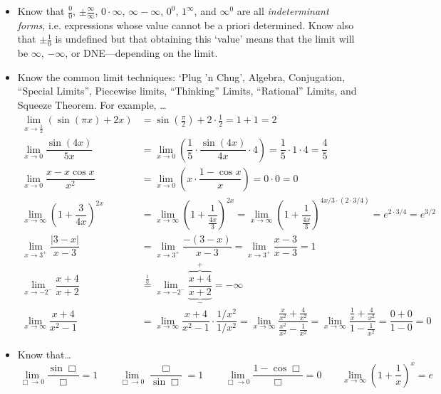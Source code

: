 \documentclass[11pt,letterpaper]{article}
\begin{document}
\begin{itemize}
\item Know that $\tfrac{0}{0}$, $\pm \tfrac{\infty}{\infty}$, $0 \cdot \infty$, $\infty - \infty$, $0^0$, $1^\infty$, and $\infty^0$ are all \textit{indeterminant forms}, i.e. expressions whose value cannot be a priori determined. Know also that $\pm\tfrac{1}{0}$ is undefined but that obtaining this `value' means that the limit will be $\infty$, $-\infty$, or DNE---depending on the limit. 

\item Know the common limit techniques: `Plug 'n Chug', Algebra, Conjugation, ``Special Limits'', Piecewise limits, ``Thinking'' Limits, ``Rational'' Limits, and Squeeze Theorem. For example, \dots
	\[
	\begin{aligned}
	\lim_{x \to \tfrac{1}{2}} \left( \sin(\pi x) + 2x \right)&= \sin \left( \tfrac{\pi}{2} \right) + 2 \cdot \tfrac{1}{2}= 1 + 1= 2 \\[0.3cm]
	\lim_{x \to 0} \dfrac{\sin(4x)}{5x}&= \lim_{x \to 0} \left( \dfrac{1}{5} \cdot \dfrac{\sin(4x)}{4x} \cdot 4 \right)= \dfrac{1}{5} \cdot 1 \cdot 4= \dfrac{4}{5} \\[0.3cm]
	\lim_{x \to 0} \dfrac{x - x \cos x}{x^2}&= \lim_{x \to 0} \left( x \cdot \dfrac{1 - \cos x}{x} \right)= 0 \cdot 0= 0 \\[0.3cm]
	\lim_{x \to \infty} \left(1 + \dfrac{3}{4x} \right)^{2x}&= \lim_{x \to \infty} \left(1 + \dfrac{1}{\tfrac{4x}{3}} \right)^{2x}= \lim_{x \to \infty} \left(1 + \dfrac{1}{\tfrac{4x}{3}} \right)^{4x/3 \cdot (2 \cdot 3/4)}= e^{2 \cdot 3/4}= e^{3/2} \\[0.3cm]
	\lim_{x \to 3^+} \dfrac{|3 - x|}{x - 3}&= \lim_{x \to 3^+} \dfrac{-(3 - x)}{x - 3}= \lim_{x \to 3^+} \dfrac{x - 3}{x - 3}= 1 \\[0.3cm]
	\lim_{x \to -2^-} \dfrac{x + 4}{x + 2}&\stackrel{\tfrac{1}{0}}{=} \lim_{x \to -2^-} \dfrac{\overbrace{x + 4}^{+}}{\underbrace{x + 2}_{-}}= -\infty \\[0.3cm]
	\lim_{x \to \infty} \dfrac{x + 4}{x^2 - 1}&= \lim_{x \to \infty} \dfrac{x + 4}{x^2 - 1} \cdot \dfrac{1/x^2}{1/x^2}= \lim_{x \to \infty} \dfrac{\tfrac{x}{x^2}+ \tfrac{4}{x^2}}{\tfrac{x^2}{x^2} - \tfrac{1}{x^2}}= \lim_{x \to \infty} \dfrac{\tfrac{1}{x} + \tfrac{4}{x^2}}{1 - \tfrac{1}{x^2}}= \dfrac{0 + 0}{1 - 0}= 0
	\end{aligned}
	\]

\item Know that\dots
	\[
	\lim_{\Box{} \to 0} \dfrac{\sin \Box{}}{\Box{}}= 1 \qquad \lim_{\Box{} \to 0} \dfrac{\Box{}}{\sin \Box{}}= 1 \qquad \lim_{\Box{} \to 0} \dfrac{1 - \cos \Box{}}{\Box{}}= 0 \qquad \lim_{x \to \infty} \left(1 + \dfrac{1}{x} \right)^x= e
	\]


\end{itemize}
\end{document}
